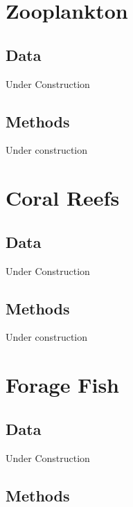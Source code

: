 \documentclass[
]{book}
\begin{document}
\hypertarget{zooplankton}{%
\chapter{Zooplankton}\label{zooplankton}}

\hypertarget{data-1}{%
\section{Data}\label{data-1}}

Under Construction

\hypertarget{methods-1}{%
\section{Methods}\label{methods-1}}

Under construction

\hypertarget{coral-reefs}{%
\chapter{Coral Reefs}\label{coral-reefs}}

\hypertarget{data-2}{%
\section{Data}\label{data-2}}

Under Construction

\hypertarget{methods-2}{%
\section{Methods}\label{methods-2}}

Under construction

\hypertarget{forage-fish}{%
\chapter{Forage Fish}\label{forage-fish}}

\hypertarget{data-3}{%
\section{Data}\label{data-3}}

Under Construction

\hypertarget{methods-3}{%
\section{Methods}\label{methods-3}}
\end{document}
